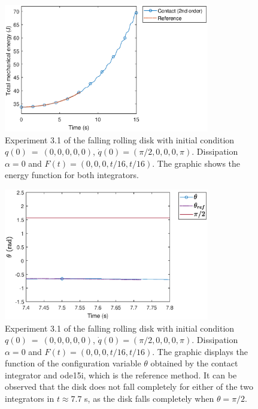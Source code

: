 \documentclass{aims}
\numberwithin{equation}{section}
\theoremstyle{definition}
\begin{document}
\begin{figure}
  \centering
  \includegraphics[width=0.8\textwidth]{fig/31energia.eps}
  \caption{Experiment 3.1 of the falling rolling disk with initial condition $q(0)~=~(0,0,0,0,0)$, $\dot{q}(0) = (\pi/2,0,0,0,\pi)$. Dissipation $\alpha = 0$ and $F(t) = (0,0,0,t/16,t/16)$. The graphic shows the energy function for both integrators.}
  \label{fig:disco_experimento_3_1_3}
\end{figure}

\begin{figure}
  \centering
  \includegraphics[width=0.8\textwidth]{fig/31theta.eps}
  \caption{Experiment 3.1 of the falling rolling disk with initial condition $q(0)~=~(0,0,0,0,0)$, $\dot{q}(0) = (\pi/2,0,0,0,\pi)$. Dissipation $\alpha = 0$ and $F(t) = (0,0,0,t/16,t/16)$. The graphic displays the function of the configuration variable $\theta$ obtained by the contact integrator and ode15i, which is the reference method. It can be observed that the disk does not fall completely for either of the two integrators in $t \approx 7.7$ s, as the disk falls completely when $\theta = \pi/2$.}
  \label{fig:disco_experimento_3_1_4}
\end{figure}
\end{document}
